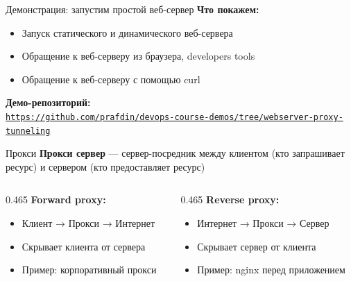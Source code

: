 \documentclass[aspectratio=169]{beamer}
\begin{document}
    \begin{frame}{Демонстрация: запустим простой веб-сервер}
        \textbf{Что покажем:}
        \begin{itemize}
            \item Запуск статического и динамического веб-сервера
            \item Обращение к веб-серверу из браузера, developers tools
            \item Обращение к веб-серверу с помощью curl
        \end{itemize}

        \vspace{0.2cm}
        \textbf{Демо-репозиторий:} \\
        \href{https://github.com/prafdin/devops-course-demos/tree/webserver-proxy-tunneling}{\texttt{https://github.com/prafdin/devops-course-demos/tree/webserver-proxy-tunneling}}

    \end{frame}

    \begin{frame}{Прокси}
        \textbf{Прокси сервер} — сервер-посредник между клиентом (кто запрашивает ресурс) и сервером (кто предоставляет ресурс)
        
        \vspace{0.5cm}
        
        \begin{columns}[t]
            \begin{column}[t]{0.465\textwidth}
                \textbf{Forward proxy:}
                \begin{itemize}
                    \item Клиент → Прокси → Интернет
                    \item Скрывает клиента от сервера
                    \item Пример: корпоративный прокси
                \end{itemize}
            \end{column}
            
            \begin{column}[t]{0.465\textwidth}
                \textbf{Reverse proxy:}
                \begin{itemize}
                    \item Интернет → Прокси → Сервер
                    \item Скрывает сервер от клиента
                    \item Пример: nginx перед приложением
                \end{itemize}
            \end{column}
        \end{columns}
    \end{frame}
\end{document}
